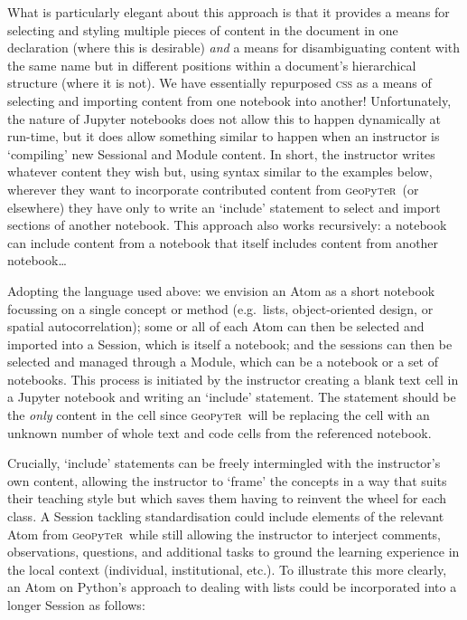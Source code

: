 \documentclass[letter, 11pt]{article}
\newcommand{\gp}{\textsc{g}eo\textsc{p}y\textsc{t}e\textsc{r}~\/}
\newcommand{\eg}{e.g.~\/}
\begin{document}
What is particularly elegant about this approach is that it provides a means for selecting and styling multiple pieces of content in the document in one declaration (where this is desirable) \textit{and} a means for disambiguating content with the same name but in different positions within a document's hierarchical structure (where it is not). We have essentially repurposed \textsc{css} as a means of selecting and importing content from one notebook into another! Unfortunately, the nature of Jupyter notebooks does not allow this to happen dynamically at run-time, but it does allow something similar to happen when an instructor is `compiling' new Sessional and Module content. In short, the instructor writes whatever content they wish but, using syntax similar to the examples below, wherever they want to incorporate contributed content from \gp (or elsewhere) they have only to write an `include' statement to select and import sections of another notebook. This approach also works recursively: a notebook can include content from a notebook that itself includes content from another notebook\ldots

Adopting the language used above: we envision an Atom as a short notebook focussing on a single concept or method (\eg lists, object-oriented design, or spatial autocorrelation); some or all of each Atom can then be selected and imported into a Session, which is itself a notebook; and the sessions can then be selected and managed through a Module, which can be a notebook or a set of notebooks. This process is initiated by the instructor creating a blank text cell in a Jupyter notebook and writing an `include' statement. The statement should be the \textit{only} content in the cell since \gp will be replacing the cell with an unknown number of whole text and code cells from the referenced notebook.

Crucially, `include' statements can be freely intermingled with the instructor's own content, allowing the instructor to `frame' the concepts in a way that suits their teaching style but which saves them having to reinvent the wheel for each class. A Session tackling standardisation could include elements of the relevant Atom from \gp while still allowing the instructor to interject comments, observations, questions, and additional tasks to ground the learning experience in the local context (individual, institutional, etc.). To illustrate this more clearly, an Atom on Python's approach to dealing with lists could be incorporated into a longer Session as follows:
\end{document}
